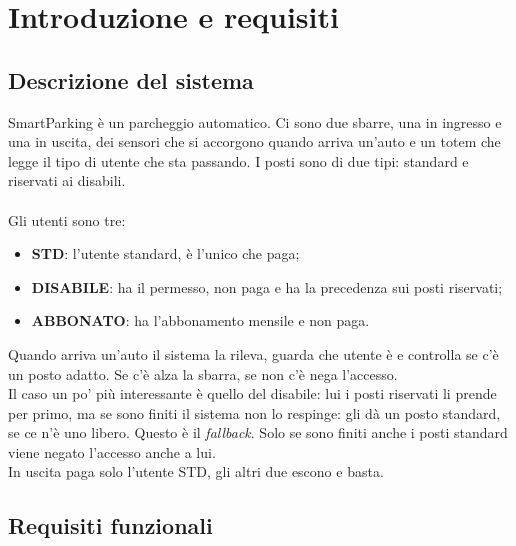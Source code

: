 \section{Introduzione e requisiti}

\subsection{Descrizione del sistema}

SmartParking è un parcheggio automatico. Ci sono due sbarre, una in ingresso e una in
uscita, dei sensori che si accorgono quando arriva un'auto e un totem che legge il tipo di utente che sta passando. 
I posti sono di due tipi: standard e riservati ai disabili. 
\\ \\
Gli utenti sono tre:

\begin{itemize}
\item \textbf{STD}: l'utente standard, è l'unico che paga;
\item \textbf{DISABILE}: ha il permesso, non paga e ha la precedenza sui posti riservati;
\item \textbf{ABBONATO}: ha l'abbonamento mensile e non paga.
\end{itemize}

Quando arriva un'auto il sistema la rileva, guarda che utente è e controlla se c'è un
posto adatto. Se c'è alza la sbarra, se non c'è nega l'accesso.
\\
Il caso un po' più interessante è quello del disabile: lui i posti riservati li prende
per primo, ma se sono finiti il sistema non lo respinge: gli dà un posto standard, se ce
n'è uno libero. Questo è il \emph{fallback}. Solo se sono finiti anche i posti standard
viene negato l'accesso anche a lui.
\\
In uscita paga solo l'utente STD, gli altri due escono e basta.

\subsection{Requisiti funzionali}

